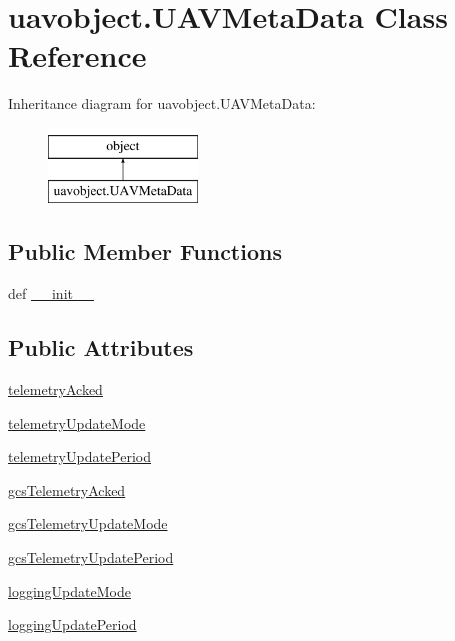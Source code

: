 \hypertarget{classuavobject_1_1_u_a_v_meta_data}{\section{uavobject.\-U\-A\-V\-Meta\-Data Class Reference}
\label{classuavobject_1_1_u_a_v_meta_data}
}
Inheritance diagram for uavobject.\-U\-A\-V\-Meta\-Data\-:\begin{figure}[H]
\begin{center}
\leavevmode
\includegraphics[height=2.000000cm]{classuavobject_1_1_u_a_v_meta_data}
\end{center}
\end{figure}
\subsection*{Public Member Functions}
\begin{DoxyCompactItemize}
\item 
def \hyperlink{classuavobject_1_1_u_a_v_meta_data_ac0abd22ffe596bda2ac028ddaa582387}{\-\_\-\-\_\-init\-\_\-\-\_\-}
\end{DoxyCompactItemize}
\subsection*{Public Attributes}
\begin{DoxyCompactItemize}
\item 
\hyperlink{classuavobject_1_1_u_a_v_meta_data_afb6f8a63345f7ac6e36b48400534c798}{telemetry\-Acked}
\item 
\hyperlink{classuavobject_1_1_u_a_v_meta_data_aea4f49d7c54e1f183409310cec519484}{telemetry\-Update\-Mode}
\item 
\hyperlink{classuavobject_1_1_u_a_v_meta_data_ae382d79f856678583a218692c901d843}{telemetry\-Update\-Period}
\item 
\hyperlink{classuavobject_1_1_u_a_v_meta_data_acac2f46750953cdd2c0f506a7a627971}{gcs\-Telemetry\-Acked}
\item 
\hyperlink{classuavobject_1_1_u_a_v_meta_data_a11b180f745b8a0e744123807d67da310}{gcs\-Telemetry\-Update\-Mode}
\item 
\hyperlink{classuavobject_1_1_u_a_v_meta_data_a52d403f306cc0d46c9e8e48d8071aaca}{gcs\-Telemetry\-Update\-Period}
\item 
\hyperlink{classuavobject_1_1_u_a_v_meta_data_a5a8be2e2c52ca37e0fc0d60114f69412}{logging\-Update\-Mode}
\item 
\hyperlink{classuavobject_1_1_u_a_v_meta_data_a8a58e769d0a9e034e2e8ce220c777ed4}{logging\-Update\-Period}
\end{DoxyCompactItemize}


